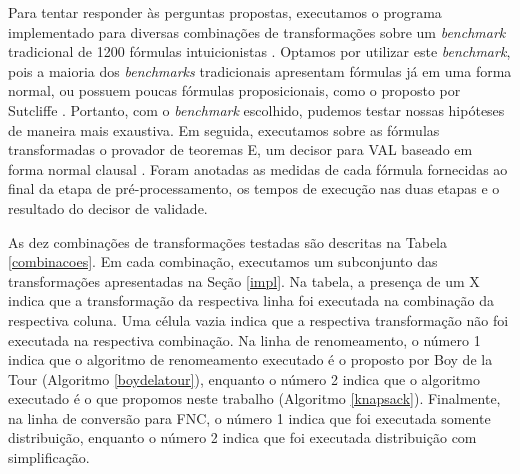 \indent

Para tentar responder às perguntas propostas, executamos o programa implementado para diversas combinações de transformações sobre um \textit{benchmark} tradicional de 1200 fórmulas intuicionistas \cite{raths07jar}. Optamos por utilizar este \emph{benchmark}, pois a maioria dos \emph{benchmarks} tradicionais apresentam fórmulas já em uma forma normal, ou possuem poucas fórmulas proposicionais, como o proposto por Sutcliffe \cite{sutcliffe09jar}. Portanto, com o \textit{benchmark} escolhido, pudemos testar nossas hipóteses de maneira mais exaustiva. Em seguida, executamos sobre as fórmulas transformadas o provador de teoremas E, um decisor para VAL baseado em forma normal clausal \cite{Schulz:LPAR-2013}. Foram anotadas as medidas de cada fórmula fornecidas ao final da etapa de pré-processamento, os tempos de execução nas duas etapas e o resultado do decisor de validade.

As dez combinações de transformações testadas são descritas na Tabela \ref{combinacoes}. Em cada combinação, executamos um subconjunto das transformações apresentadas na Seção \ref{impl}. Na tabela, a presença de um X indica que a transformação da respectiva linha foi executada na combinação da respectiva coluna. Uma célula vazia indica que a respectiva transformação não foi executada na respectiva combinação. Na linha de renomeamento, o número 1 indica que o algoritmo de renomeamento executado é o proposto por Boy de la Tour (Algoritmo \ref{boydelatour}), enquanto o número 2 indica que o algoritmo executado é o que propomos neste trabalho (Algoritmo \ref{knapsack}). Finalmente, na linha de conversão para FNC, o número 1 indica que foi executada somente distribuição, enquanto o número 2 indica que foi executada distribuição com simplificação.


